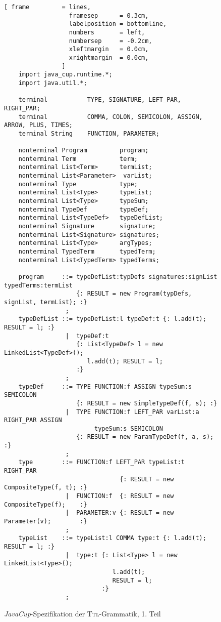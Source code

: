 \begin{figure}[!ht]
\centering
\begin{Verbatim}[ frame         = lines, 
                  framesep      = 0.3cm, 
                  labelposition = bottomline,
                  numbers       = left,
                  numbersep     = -0.2cm,
                  xleftmargin   = 0.0cm,
                  xrightmargin  = 0.0cm,
                ]
    import java_cup.runtime.*;
    import java.util.*;
    
    terminal           TYPE, SIGNATURE, LEFT_PAR, RIGHT_PAR;
    terminal           COMMA, COLON, SEMICOLON, ASSIGN, ARROW, PLUS, TIMES;
    terminal String    FUNCTION, PARAMETER;
    
    nonterminal Program         program;
    nonterminal Term            term;
    nonterminal List<Term>      termList;
    nonterminal List<Parameter>  varList;
    nonterminal Type            type;
    nonterminal List<Type>      typeList;
    nonterminal List<Type>      typeSum;
    nonterminal TypeDef         typeDef;
    nonterminal List<TypeDef>   typeDefList;
    nonterminal Signature       signature;
    nonterminal List<Signature> signatures;
    nonterminal List<Type>      argTypes;
    nonterminal TypedTerm       typedTerm;
    nonterminal List<TypedTerm> typedTerms;
    
    program     ::= typeDefList:typDefs signatures:signList typedTerms:termList 
                    {: RESULT = new Program(typDefs, signList, termList); :}
                 ;
    typeDefList ::= typeDefList:l typeDef:t {: l.add(t); RESULT = l; :}
                 |  typeDef:t               
                    {: List<TypeDef> l = new LinkedList<TypeDef>(); 
                       l.add(t); RESULT = l; 
                    :}
                 ;
    typeDef     ::= TYPE FUNCTION:f ASSIGN typeSum:s SEMICOLON
                    {: RESULT = new SimpleTypeDef(f, s); :}
                 |  TYPE FUNCTION:f LEFT_PAR varList:a RIGHT_PAR ASSIGN 
                         typeSum:s SEMICOLON 
                    {: RESULT = new ParamTypeDef(f, a, s); :}
                 ;
    type        ::= FUNCTION:f LEFT_PAR typeList:t RIGHT_PAR 
                                {: RESULT = new CompositeType(f, t); :}
                 |  FUNCTION:f  {: RESULT = new CompositeType(f);    :}
                 |  PARAMETER:v {: RESULT = new Parameter(v);        :}
                 ;    
    typeList    ::= typeList:l COMMA type:t {: l.add(t); RESULT = l; :}
                 |  type:t {: List<Type> l = new LinkedList<Type>(); 
                              l.add(t); 
                              RESULT = l; 
                           :}   
                 ;   
\end{Verbatim}
\vspace*{-0.3cm}
\caption{\textsl{JavaCup}-Spezifikation der \textsc{Ttl}-Grammatik, 1. Teil}
\label{fig:typeChecker.cup-1}
\end{figure}


